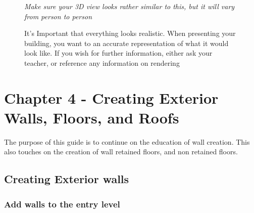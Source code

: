 \documentclass{tufte-book} %
\begin{document}
\begin{enumerate}
\begin{figure}
		\caption[Revit 3D view after Topographic Creation]{It's Important that everything looks realistic. When presenting your building, you want to an accurate representation of what it would look like. If you wish for further information, either ask your teacher, or reference any information on rendering}
		\emph{Make sure your 3D view looks rather similar to this, but it will vary from person to person}
		\label{fig:revthreedtopo}
	\end{figure}
\end{enumerate}
	
\chapter{Chapter 4 - Creating Exterior Walls, Floors, and Roofs}
\label{ch:4}
The purpose of this guide is to continue on the education of wall creation. This also touches on the creation of wall retained floors, and non retained floors.
\section{Creating Exterior walls}
\subsection{Add walls to the entry level}
\end{document}

